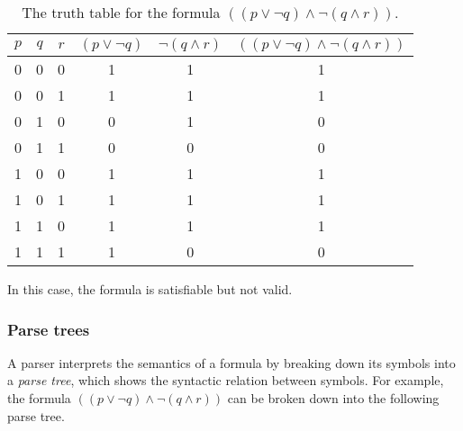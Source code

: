 \begin{table}[H]
    \centering
    \begin{tabular}{|c|c|c||c|c||c|}
        \hline
        \(p\) & \(q\) & \(r\) & \((p \lor \neg q)\) & \(\neg (q \land r)\) & \(((p \lor \neg q) \land \neg (q \land r))\)\\
        \hline
        0 & 0 & 0 & 1 & 1 & 1 \\
        \hline
        0 & 0 & 1 & 1 & 1 & 1 \\
        \hline
        0 & 1 & 0 & 0 & 1 & 0 \\
        \hline
        0 & 1 & 1 & 0 & 0 & 0\\
        \hline
        1 & 0 & 0 & 1 & 1 & 1 \\
        \hline
        1 & 0 & 1 & 1 & 1 & 1 \\
        \hline
        1 & 1 & 0 & 1 & 1 & 1 \\
        \hline
        1 & 1 & 1 & 1 & 0 & 0 \\
        \hline
    \end{tabular}

    \caption{The truth table for the formula \(((p \lor \neg q) \land \neg (q \land r))\).}
    \label{tab:Ch01-truth-table}
\end{table}

In this case, the formula is satisfiable but not valid.



\subsubsection{Parse trees}

A parser interprets the semantics of a formula by breaking down its symbols into a \emph{parse tree}, which shows the syntactic relation between symbols. For example, the formula \(((p \lor \neg q) \land \neg (q \land r))\) can be broken down into the following parse tree.


